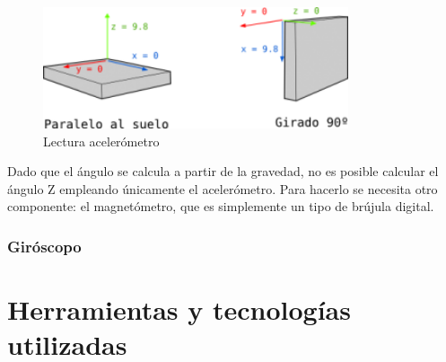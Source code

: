 \begin{figure}
\centering
\includegraphics[width=90mm]{Figures/imu-acel.png}
\caption[Lectura acelerómetro]{Lectura acelerómetro}
\label{fig:ImuAcel}
\end{figure}

Dado que el ángulo se calcula a partir de la gravedad, no es posible calcular el ángulo Z empleando únicamente el acelerómetro. Para hacerlo se necesita otro componente: el magnetómetro, que es simplemente un tipo de brújula digital.

\subsubsection{Giróscopo}


\section{Herramientas y tecnologías utilizadas}
